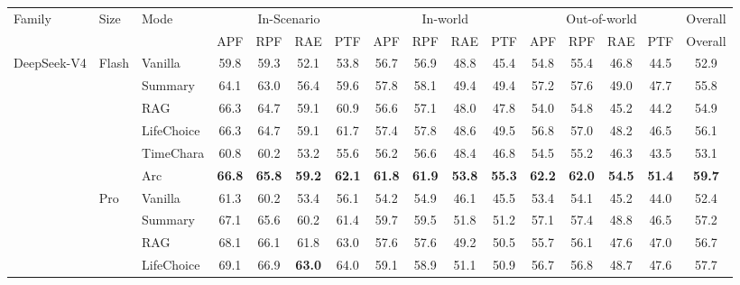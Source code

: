 \documentclass[11pt]{article}
\begin{document}
\begin{table}[!htbp]
\centering
\scriptsize
\setlength{\tabcolsep}{5.5pt}
\renewcommand{\arraystretch}{0.85}
\setlength{\aboverulesep}{0.2ex}
\setlength{\belowrulesep}{0.2ex}
\begin{tabular}{lllccccccccccccc}
\toprule
Family & Size & Mode & \multicolumn{4}{c}{In-Scenario} & \multicolumn{4}{c}{In-world} & \multicolumn{4}{c}{Out-of-world} & Overall \\
\cmidrule(lr){4-7} \cmidrule(lr){8-11} \cmidrule(lr){12-15} \cmidrule(lr){16-16}
 & & & APF & RPF & RAE & PTF & APF & RPF & RAE & PTF & APF & RPF & RAE & PTF & Overall \\
\midrule
\multirow[t]{12}{*}{DeepSeek-V4} & \multirow[t]{6}{*}{Flash} & Vanilla & 59.8 & 59.3 & 52.1 & 53.8 & 56.7 & 56.9 & 48.8 & 45.4 & 54.8 & 55.4 & 46.8 & 44.5 & 52.9 \\
 &  & Summary & 64.1 & 63.0 & 56.4 & 59.6 & 57.8 & 58.1 & 49.4 & 49.4 & 57.2 & 57.6 & 49.0 & 47.7 & 55.8 \\
 &  & RAG & 66.3 & 64.7 & 59.1 & 60.9 & 56.6 & 57.1 & 48.0 & 47.8 & 54.0 & 54.8 & 45.2 & 44.2 & 54.9 \\
 &  & LifeChoice & 66.3 & 64.7 & 59.1 & 61.7 & 57.4 & 57.8 & 48.6 & 49.5 & 56.8 & 57.0 & 48.2 & 46.5 & 56.1 \\
 &  & TimeChara & 60.8 & 60.2 & 53.2 & 55.6 & 56.2 & 56.6 & 48.4 & 46.8 & 54.5 & 55.2 & 46.3 & 43.5 & 53.1 \\
 &  & \cellcolor{yellow!15} Arc & \cellcolor{yellow!15} \textbf{66.8} & \cellcolor{yellow!15} \textbf{65.8} & \cellcolor{yellow!15} \textbf{59.2} & \cellcolor{yellow!15} \textbf{62.1} & \cellcolor{yellow!15} \textbf{61.8} & \cellcolor{yellow!15} \textbf{61.9} & \cellcolor{yellow!15} \textbf{53.8} & \cellcolor{yellow!15} \textbf{55.3} & \cellcolor{yellow!15} \textbf{62.2} & \cellcolor{yellow!15} \textbf{62.0} & \cellcolor{yellow!15} \textbf{54.5} & \cellcolor{yellow!15} \textbf{51.4} & \cellcolor{yellow!15} \textbf{59.7} \\
\cmidrule(l){2-16}
 & \multirow[t]{6}{*}{Pro} & Vanilla & 61.3 & 60.2 & 53.4 & 56.1 & 54.2 & 54.9 & 46.1 & 45.5 & 53.4 & 54.1 & 45.2 & 44.0 & 52.4 \\
 &  & Summary & 67.1 & 65.6 & 60.2 & 61.4 & 59.7 & 59.5 & 51.8 & 51.2 & 57.1 & 57.4 & 48.8 & 46.5 & 57.2 \\
 &  & RAG & 68.1 & 66.1 & 61.8 & 63.0 & 57.6 & 57.6 & 49.2 & 50.5 & 55.7 & 56.1 & 47.6 & 47.0 & 56.7 \\
 &  & LifeChoice & 69.1 & 66.9 & \textbf{63.0} & 64.0 & 59.1 & 58.9 & 51.1 & 50.9 & 56.7 & 56.8 & 48.7 & 47.6 & 57.7 \\

\end{tabular}
\end{table}
\end{document}
